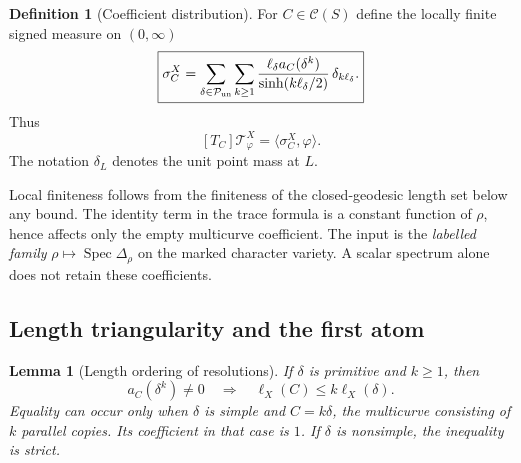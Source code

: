 \documentclass[11pt,a4paper]{article}
\numberwithin{equation}{section}
\newtheorem{lemma}[theorem]{Lemma}
\theoremstyle{definition}
\newtheorem{definition}[theorem]{Definition}
\theoremstyle{remark}
\begin{document}
\begin{definition}[Coefficient distribution]
For $C\in\mathscr C(S)$ define the locally finite signed measure
on $(0,\infty)$
\begin{equation}
 \boxed{
 \sigma_C^X
 =\sum_{\delta\in\mathcal P_{\rm un}}\sum_{k\geq1}
   \frac{\ell_\delta a_C(\delta^k)}
        {\sinh(k\ell_\delta/2)}\,\delta_{k\ell_\delta}.
 }
 \label{eq:coeffdistribution}
\end{equation}
Thus
\[
 [T_C]\mathscr T^X_\varphi=\langle\sigma_C^X,\varphi\rangle.
\]
The notation $\delta_L$ denotes the unit point mass at $L$.
\end{definition}

Local finiteness follows from the finiteness of the closed-geodesic
length set below any bound. The identity term in the trace formula
is a constant function of $\rho$, hence affects only the empty
multicurve coefficient. The input is the \emph{labelled family}
$\rho\mapsto\operatorname{Spec}\Delta_\rho$ on the marked character
variety. A scalar spectrum alone does not retain these coefficients.

\subsection{Length triangularity and the first atom}

\begin{lemma}[Length ordering of resolutions]
\label{lem:coefftriangularity}
If $\delta$ is primitive and $k\geq1$, then
\[
 a_C(\delta^k)\neq0\quad\Longrightarrow\quad
 \ell_X(C)\leq k\ell_X(\delta).
\]
Equality can occur only when $\delta$ is simple and $C=k\delta$,
the multicurve consisting of $k$ parallel copies. Its coefficient
in that case is $1$. If $\delta$ is nonsimple, the inequality is strict.
\end{lemma}
\end{document}

